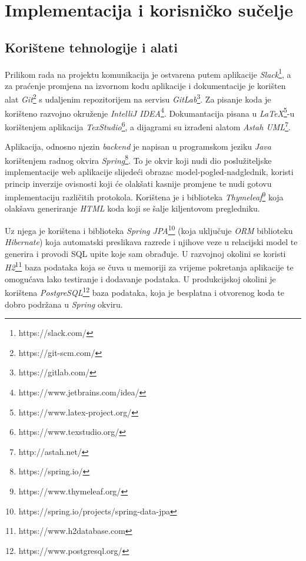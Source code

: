 \chapter{Implementacija i korisničko sučelje}
		
		
		\section{Korištene tehnologije i alati}
%		
%			

		
		Prilikom rada na projektu komunikacija je ostvarena putem aplikacije \textit{Slack}\footnote{https://slack.com/}, a za praćenje promjena na izvornom kodu aplikacije i dokumentacije je korišten alat \textit{Git}\footnote{https://git-scm.com/} s udaljenim repozitorijem na servisu \textit{GitLab}\footnote{https://gitlab.com/}. Za pisanje koda je korišteno razvojno okruženje \textit{IntelliJ IDEA}\footnote{https://www.jetbrains.com/idea/}. Dokumantacija pisana u \textit{LaTeX}\footnote{https://www.latex-project.org/}-u korištenjem aplikacija \textit{TexStudio}\footnote{https://www.texstudio.org/}, a dijagrami su izrađeni alatom \textit{Astah UML}\footnote{http://astah.net/}.
		
		Aplikacija, odnosno njezin \textit{backend} je napisan u programskom jeziku \textit{Java} korištenjem radnog okvira \textit{Spring}\footnote{https://spring.io/}. To je okvir koji nudi dio poslužiteljske implementacije web aplikacije slijedeći obrazac model-pogled-nadglednik, koristi princip inverzije ovisnosti koji će olakšati kasnije promjene te nudi gotovu implementaciju različitih protokola. Korištena je i biblioteka \textit{Thymeleaf}\footnote{https://www.thymeleaf.org/} koja olakšava generiranje \textit{HTML} koda koji se šalje kiljentovom pregledniku.
		
		Uz njega je korištena i biblioteka \textit{Spring JPA}\footnote{https://spring.io/projects/spring-data-jpa} (koja uključuje \textit{ORM} biblioteku \textit{Hibernate}) koja automatski preslikava razrede i njihove veze u relacijski model te generira i provodi SQL upite koje sam obrađuje. U razvojnoj okolini se koristi \textit{H2}\footnote{https://www.h2database.com} baza podataka koja se čuva u memoriji za vrijeme pokretanja aplikacije te omogućava lako testiranje i dodavanje podataka. U produkcijskoj okolini je korištena \textit{PostgreSQL}\footnote{https://www.postgresql.org/} baza podataka, koja je besplatna i otvorenog koda te dobro podržana u \textit{Spring} okviru.
		
